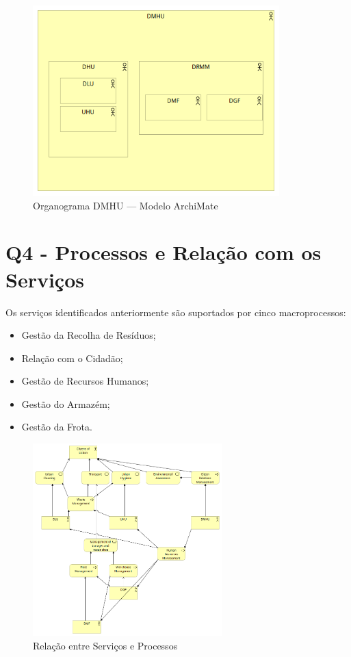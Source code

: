 \documentclass[12pt,a4paper,final]{article}
\begin{document}
    \begin{figure}[h!]
        \centering
        \includegraphics[width=0.85\textwidth]{Q3 - Organizational Structure}
        \caption{Organograma DMHU — Modelo ArchiMate}
        \label{fig:3}
    \end{figure}



    \section*{Q4 - Processos e Relação com os Serviços}\label{sec:processos-e-relacao-com-os-servicos}
    Os serviços identificados anteriormente são suportados por cinco macroprocessos:
    \begin{itemize}
        \item Gestão da Recolha de Resíduos;
        \item Relação com o Cidadão;
        \item Gestão de Recursos Humanos;
        \item Gestão do Armazém;
        \item Gestão da Frota.
    \end{itemize}

    \begin{figure}[h!]
        \centering
        \includegraphics[width=0.65\textwidth]{Q4 - Relation Between Business services and Business Processes}
        \caption{Relação entre Serviços e Processos}
        \label{fig:4}
    \end{figure}
\end{document}
